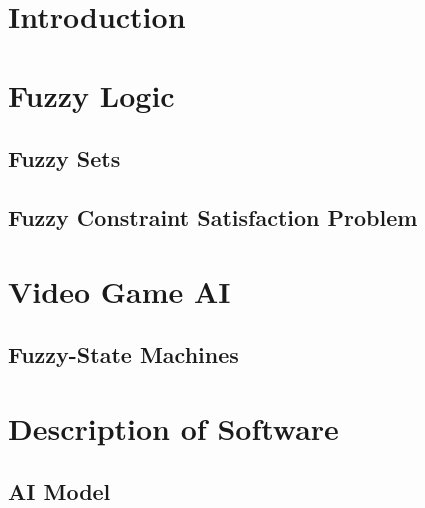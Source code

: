 \documentclass[10pt,palatino,code,picins,kaukecopyright,openright,woolshort,dropcaps,verbatim,index,euler]{woosterthesis}
\begin{document}

\chapter{Introduction}


\chapter{Fuzzy Logic}
\section{Fuzzy Sets}
\section{Fuzzy Constraint Satisfaction Problem}
\chapter{Video Game AI}
\section{Fuzzy-State Machines}
\chapter{Description of Software}
\section{AI Model}
\end{document}
